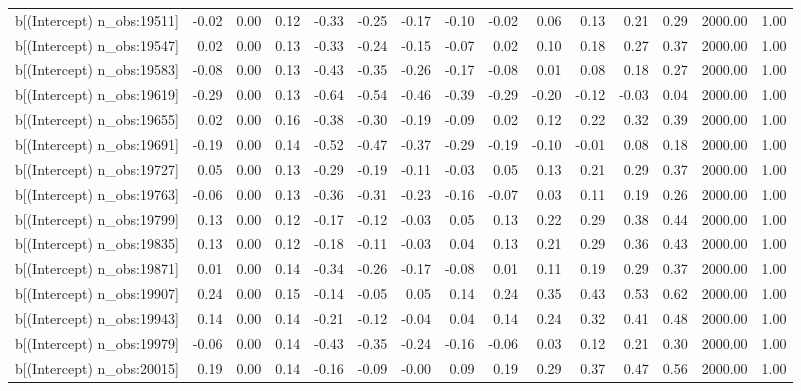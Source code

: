 \begin{table}[ht]
\begin{tabular}{rrrrrrrrrrrrrrr}
  b[(Intercept) n\_obs:19511] & -0.02 & 0.00 & 0.12 & -0.33 & -0.25 & -0.17 & -0.10 & -0.02 & 0.06 & 0.13 & 0.21 & 0.29 & 2000.00 & 1.00 \\ 
  b[(Intercept) n\_obs:19547] & 0.02 & 0.00 & 0.13 & -0.33 & -0.24 & -0.15 & -0.07 & 0.02 & 0.10 & 0.18 & 0.27 & 0.37 & 2000.00 & 1.00 \\ 
  b[(Intercept) n\_obs:19583] & -0.08 & 0.00 & 0.13 & -0.43 & -0.35 & -0.26 & -0.17 & -0.08 & 0.01 & 0.08 & 0.18 & 0.27 & 2000.00 & 1.00 \\ 
  b[(Intercept) n\_obs:19619] & -0.29 & 0.00 & 0.13 & -0.64 & -0.54 & -0.46 & -0.39 & -0.29 & -0.20 & -0.12 & -0.03 & 0.04 & 2000.00 & 1.00 \\ 
  b[(Intercept) n\_obs:19655] & 0.02 & 0.00 & 0.16 & -0.38 & -0.30 & -0.19 & -0.09 & 0.02 & 0.12 & 0.22 & 0.32 & 0.39 & 2000.00 & 1.00 \\ 
  b[(Intercept) n\_obs:19691] & -0.19 & 0.00 & 0.14 & -0.52 & -0.47 & -0.37 & -0.29 & -0.19 & -0.10 & -0.01 & 0.08 & 0.18 & 2000.00 & 1.00 \\ 
  b[(Intercept) n\_obs:19727] & 0.05 & 0.00 & 0.13 & -0.29 & -0.19 & -0.11 & -0.03 & 0.05 & 0.13 & 0.21 & 0.29 & 0.37 & 2000.00 & 1.00 \\ 
  b[(Intercept) n\_obs:19763] & -0.06 & 0.00 & 0.13 & -0.36 & -0.31 & -0.23 & -0.16 & -0.07 & 0.03 & 0.11 & 0.19 & 0.26 & 2000.00 & 1.00 \\ 
  b[(Intercept) n\_obs:19799] & 0.13 & 0.00 & 0.12 & -0.17 & -0.12 & -0.03 & 0.05 & 0.13 & 0.22 & 0.29 & 0.38 & 0.44 & 2000.00 & 1.00 \\ 
  b[(Intercept) n\_obs:19835] & 0.13 & 0.00 & 0.12 & -0.18 & -0.11 & -0.03 & 0.04 & 0.13 & 0.21 & 0.29 & 0.36 & 0.43 & 2000.00 & 1.00 \\ 
  b[(Intercept) n\_obs:19871] & 0.01 & 0.00 & 0.14 & -0.34 & -0.26 & -0.17 & -0.08 & 0.01 & 0.11 & 0.19 & 0.29 & 0.37 & 2000.00 & 1.00 \\ 
  b[(Intercept) n\_obs:19907] & 0.24 & 0.00 & 0.15 & -0.14 & -0.05 & 0.05 & 0.14 & 0.24 & 0.35 & 0.43 & 0.53 & 0.62 & 2000.00 & 1.00 \\ 
  b[(Intercept) n\_obs:19943] & 0.14 & 0.00 & 0.14 & -0.21 & -0.12 & -0.04 & 0.04 & 0.14 & 0.24 & 0.32 & 0.41 & 0.48 & 2000.00 & 1.00 \\ 
  b[(Intercept) n\_obs:19979] & -0.06 & 0.00 & 0.14 & -0.43 & -0.35 & -0.24 & -0.16 & -0.06 & 0.03 & 0.12 & 0.21 & 0.30 & 2000.00 & 1.00 \\ 
  b[(Intercept) n\_obs:20015] & 0.19 & 0.00 & 0.14 & -0.16 & -0.09 & -0.00 & 0.09 & 0.19 & 0.29 & 0.37 & 0.47 & 0.56 & 2000.00 & 1.00 \\ 

\end{tabular}
\end{table}

